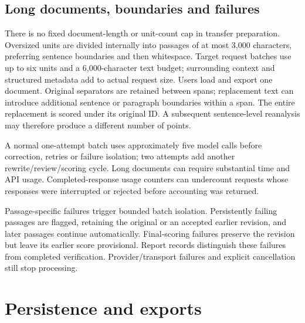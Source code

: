 \documentclass[manuscript,screen,nonacm]{acmart}
\begin{document}
\subsection{Long documents, boundaries and
failures}\label{long-documents-boundaries-and-failures}

There is no fixed document-length or unit-count cap in transfer
preparation. Oversized units are divided internally into passages of at
most 3,000 characters, preferring sentence boundaries and then
whitespace. Target request batches use up to six units and a
6,000-character text budget; surrounding context and structured metadata
add to actual request size. Users load and export one document. Original
separators are retained between spans; replacement text can introduce
additional sentence or paragraph boundaries within a span. The entire
replacement is scored under its original ID. A subsequent sentence-level
reanalysis may therefore produce a different number of points.

A normal one-attempt batch uses approximately five model calls before
correction, retries or failure isolation; two attempts add another
rewrite/review/scoring cycle. Long documents can require substantial
time and API usage. Completed-response usage counters can undercount
requests whose responses were interrupted or rejected before accounting
was returned.

Passage-specific failures trigger bounded batch isolation. Persistently
failing passages are flagged, retaining the original or an accepted
earlier revision, and later passages continue automatically.
Final-scoring failures preserve the revision but leave its earlier score
provisional. Report records distinguish these failures from completed
verification. Provider/transport failures and explicit cancellation
still stop processing.


\section{Persistence and exports}\label{persistence-and-exports}
\end{document}
